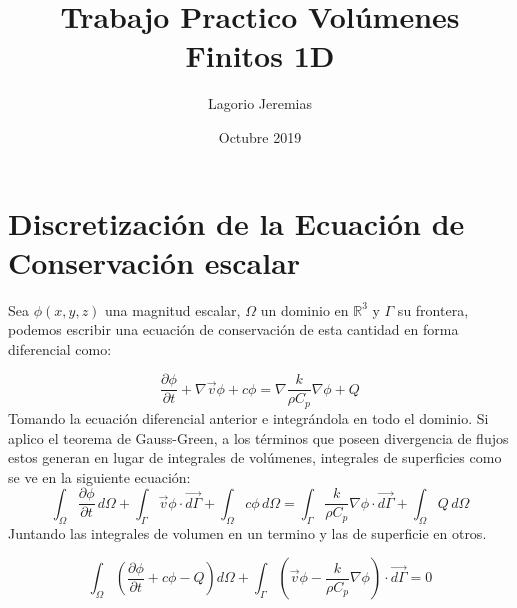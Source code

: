 \documentclass{article}
\title{Trabajo Practico Volúmenes Finitos 1D}
\author{Lagorio Jeremias }
\date{ Octubre 2019}
\begin{document}
\maketitle

\section{Discretización de la Ecuación de Conservación escalar }

    Sea $\phi(x,y,z)$ una magnitud escalar, $\Omega$ un dominio en $\mathbb{R}^3$ y $\Gamma$ su frontera, podemos escribir una ecuación de conservación de esta cantidad en forma diferencial como: 

    \begin{equation}
        \dfrac {{ \partial \phi}} {{ \partial t}} + \nabla \vec{v}\phi+c\phi = \nabla  \frac{k}{\rho C_p} \nabla \phi + Q
        \end{equation}
    Tomando la ecuación diferencial anterior e integrándola en todo el dominio. Si aplico el teorema de Gauss-Green, a los términos que poseen divergencia de flujos estos generan en lugar de integrales de volúmenes, integrales de superficies como se ve en la siguiente ecuación:
    \begin{equation}
       \int_{\Omega} \dfrac { \partial \phi} { \partial t} \, d\Omega + \int_{\Gamma} \vec{v}\phi \cdot \vec{d\Gamma} + \int_{\Omega} c \phi \, d\Omega = \int_{\Gamma}  \frac{k}{\rho C_p} \nabla \phi \cdot \vec{d\Gamma} + \int_{\Omega} Q \, d\Omega
    \end{equation}
    Juntando las integrales de volumen en un termino y las de superficie en otros.\
    
   \begin{equation}
       \int_{\Omega} \left( \dfrac {{ \partial \phi}} {{ \partial t}} + c \phi - Q \right) d\Omega + \int_{\Gamma} \left( \vec{v}\phi - \frac{k}{\rho C_p} \nabla \phi \right) \cdot \vec{d\Gamma} = 0
   \end{equation} 
   
\end{document}
